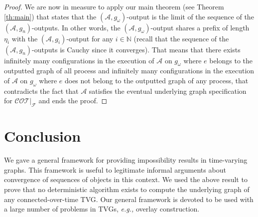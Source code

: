 \documentclass[11pt]{article}
\newcommand{\eg}{{\em e.g.,}\xspace}
\begin{document}
\begin{proof}
We are now in measure to apply our main theorem (see Theorem \ref{th:main}) that states that the $(\mathcal{A},g_\omega)$-output is the limit of the sequence of the $(\mathcal{A},g_n)$-outputs. In other words, the $(\mathcal{A},g_\omega)$-output shares a prefix of length $\eta_i$ with the $(\mathcal{A},g_i)$-output for any $i\in\mathbb{N}$ (recall that the sequence of the $(\mathcal{A},g_n)$-outputs is Cauchy since it converges). That means that there exists infinitely many configurations in the execution of $\mathcal{A}$ on $g_\omega$ where $e$ belongs to the outputted graph of all process and infinitely many configurations in the execution of $\mathcal{A}$ on $g_\omega$ where $e$ does not belong to the outputted graph of any process, that contradicts the fact that $\mathcal{A}$ satisfies the eventual underlying graph specification for $\mathcal{COT}|_\mathcal{F}$ and ends the proof.
\end{proof}

\section{Conclusion}\label{sec:conc}

We gave a general framework for providing impossibility results in time-varying graphs. This framework is useful to legitimate informal arguments about convergence of sequences of objects in this context. We used the above result to prove that no deterministic algorithm exists to compute the underlying graph of any connected-over-time TVG. Our general framework is devoted to be used with a large number of problems in TVGs, \eg overlay construction.

\begin{small}


\end{small}
\end{document}
